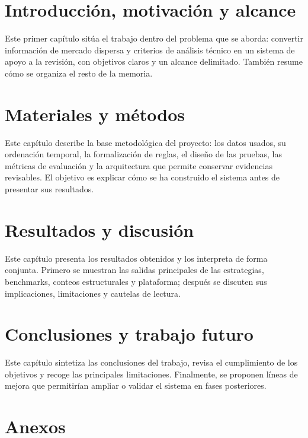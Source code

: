 \documentclass[twoside,spanish,a4paper,12pt]{tfg}
\begin{document}
\justify

\chapter{Introducci\'on, motivaci\'on y alcance}
\pagestyle{tfg}
\label{cap:introduccion}
Este primer cap\'itulo sit\'ua el trabajo dentro del problema que se aborda:
convertir informaci\'on de mercado dispersa y criterios de an\'alisis t\'ecnico
en un sistema de apoyo a la revisi\'on, con objetivos claros y un alcance
delimitado. Tambi\'en resume c\'omo se organiza el resto de la memoria.



\chapter{Materiales y m\'etodos}
\label{cap:metodologia}
Este cap\'itulo describe la base metodol\'ogica del proyecto: los datos usados,
su ordenaci\'on temporal, la formalizaci\'on de reglas, el dise\~no de las pruebas,
las m\'etricas de evaluaci\'on y la arquitectura que permite conservar evidencias
revisables. El objetivo es explicar c\'omo se ha construido el sistema antes de
presentar sus resultados.



\chapter{Resultados y discusi\'on}
\label{cap:resultados}
Este cap\'itulo presenta los resultados obtenidos y los interpreta de forma
conjunta. Primero se muestran las salidas principales de las estrategias,
benchmarks, conteos estructurales y plataforma; despu\'es se discuten sus
implicaciones, limitaciones y cautelas de lectura.



\chapter{Conclusiones y trabajo futuro}
\label{cap:conclusiones}
Este cap\'itulo sintetiza las conclusiones del trabajo, revisa el cumplimiento
de los objetivos y recoge las principales limitaciones. Finalmente, se proponen
l\'ineas de mejora que permitir\'ian ampliar o validar el sistema en fases
posteriores.



\clearpage
\pagestyle{bibliography}
{}



\clearpage
\pagestyle{appendix}

\appendix
\chapter{Anexos}
\label{cap:anexos}

\end{document}

